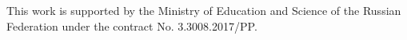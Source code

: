 \documentclass[a4paper]{panl}
\begin{document}
This work is supported by the Ministry of Education and Science of the Russian Federation under the contract No. 3.3008.2017/PP.






\end{document}
